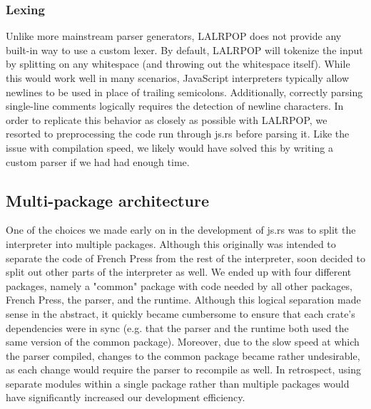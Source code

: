 \documentclass{article}
\begin{document}
\subsubsection*{Lexing}

Unlike more mainstream parser generators, LALRPOP does not provide any built-in
way to use a custom lexer. By default, LALRPOP will tokenize the input by
splitting on any whitespace (and throwing out the whitespace itself). While this
would work well in many scenarios, JavaScript interpreters typically allow
newlines to be used in place of trailing semicolons. Additionally, correctly
parsing single-line comments logically requires the detection of newline
characters. In order to replicate this behavior as closely as possible with
LALRPOP, we resorted to preprocessing the code run through js.rs before parsing
it. Like the issue with compilation speed, we likely would have solved this by
writing a custom parser if we had had enough time.

\subsection*{Multi-package architecture}

One of the choices we made early on in the development of js.rs was to split the
interpreter into multiple packages. Although this originally was intended to
separate the code of French Press from the rest of the interpreter, soon decided
to split out other parts of the interpreter as well. We ended up with four
different packages, namely a "common" package with code needed by all other
packages, French Press, the parser, and the runtime. Although this logical
separation made sense in the abstract, it quickly became cumbersome to ensure
that each crate's dependencies were in sync (e.g. that the parser and the
runtime both used the same version of the common package). Moreover, due to the
slow speed at which the parser compiled, changes to the common package became
rather undesirable, as each change would require the parser to recompile as
well. In retrospect, using separate modules within a single package rather than
multiple packages would have significantly increased our development efficiency.

\pagebreak
\end{document}
